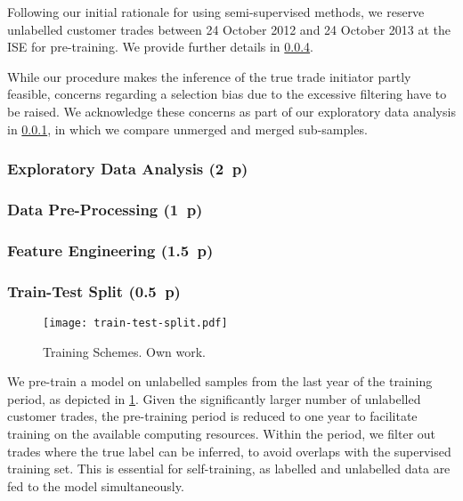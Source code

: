 Following our initial rationale for using semi-supervised methods, we reserve unlabelled customer trades between 24 October 2012 and 24 October 2013 at the \gls{ISE} for pre-training. We provide further details in \cref{sec:train-test-split}.

While our procedure makes the inference of the true trade initiator partly feasible, concerns regarding a selection bias due to the excessive filtering have to be raised. We acknowledge these concerns as part of our exploratory data analysis in \cref{sec:exploratory-data-analysis}, in which we compare unmerged and merged sub-samples.

\subsubsection{Exploratory Data Analysis (2~p)}\label{sec:exploratory-data-analysis}

\subsubsection{Data Pre-Processing (1~p)}\label{sec:data-preprocessing}

\subsubsection{Feature Engineering (1.5~p)}\label{sec:feature-engineering}

\subsubsection{Train-Test Split (0.5~p)}\label{sec:train-test-split}

\begin{figure}[ht]
    \centering
    \texttt{[image: train-test-split.pdf]}
    \caption[Training Schemes]{Training Schemes. Own work.}
    \label{fig:train-test-split}
\end{figure}

We pre-train a model on unlabelled samples from the last year of the training period, as depicted in \cref{fig:train-test-split}. Given the significantly larger number of unlabelled customer trades, the pre-training period is reduced to one year to facilitate training on the available computing resources. Within the period, we filter out trades where the true label can be inferred, to avoid overlaps with the supervised training set. This is essential for self-training, as labelled and unlabelled data are fed to the model simultaneously. 

